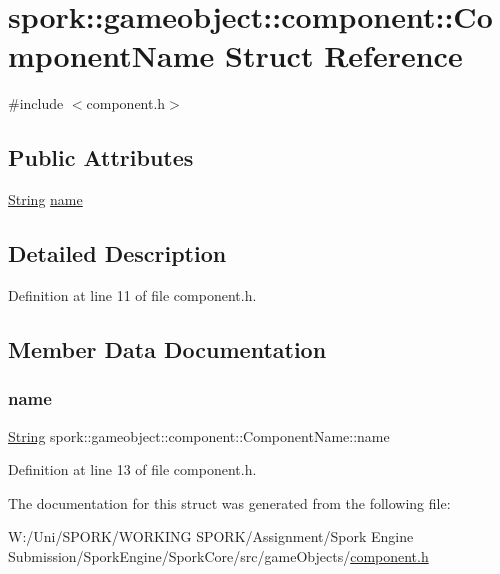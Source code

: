 \hypertarget{structspork_1_1gameobject_1_1component_1_1_component_name}{}\section{spork\+:\+:gameobject\+:\+:component\+:\+:Component\+Name Struct Reference}
\label{structspork_1_1gameobject_1_1component_1_1_component_name}


{\ttfamily \#include $<$component.\+h$>$}

\subsection*{Public Attributes}
\begin{DoxyCompactItemize}
\item 
\hyperlink{my_string_8h_afbeda3fd1bdc8c37d01bdf9f5c8274ff}{String} \hyperlink{structspork_1_1gameobject_1_1component_1_1_component_name_a70d92f3d166e10b0deacf783555eeb28}{name}
\end{DoxyCompactItemize}


\subsection{Detailed Description}


Definition at line 11 of file component.\+h.



\subsection{Member Data Documentation}
\mbox{\label{structspork_1_1gameobject_1_1component_1_1_component_name_a70d92f3d166e10b0deacf783555eeb28}} 
\subsubsection{\texorpdfstring{name}{name}}
{\footnotesize\ttfamily \hyperlink{my_string_8h_afbeda3fd1bdc8c37d01bdf9f5c8274ff}{String} spork\+::gameobject\+::component\+::\+Component\+Name\+::name}



Definition at line 13 of file component.\+h.



The documentation for this struct was generated from the following file\+:\begin{DoxyCompactItemize}
\item 
W\+:/\+Uni/\+S\+P\+O\+R\+K/\+W\+O\+R\+K\+I\+N\+G S\+P\+O\+R\+K/\+Assignment/\+Spork Engine Submission/\+Spork\+Engine/\+Spork\+Core/src/game\+Objects/\hyperlink{component_8h}{component.\+h}\end{DoxyCompactItemize}
